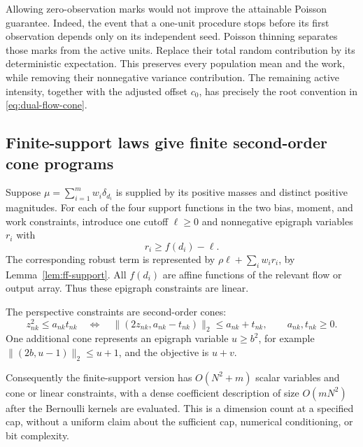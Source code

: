 Allowing zero-observation marks would not improve the attainable
Poisson guarantee. Indeed, the event that a one-unit procedure stops
before its first observation depends only on its independent seed.
Poisson thinning separates those marks from the active units. Replace
their total random contribution by its deterministic expectation.
This preserves every population mean and the work, while removing
their nonnegative variance contribution. The remaining active
intensity, together with the adjusted offset $c_0$, has precisely
the root convention in \eqref{eq:dual-flow-cone}.

\subsection{Finite-support laws give finite second-order cone programs}

Suppose $\mu=\sum_{i=1}^{m}w_i\delta_{d_i}$ is supplied by its positive
masses and distinct positive magnitudes. For each of the four support
functions in the two bias, moment, and work constraints, introduce
one cutoff $\ell\ge0$ and nonnegative epigraph variables $r_i$ with
\[
 r_i\ge f(d_i)-\ell.
\]
The corresponding robust term is represented by
$\rho\ell+\sum_iw_ir_i$, by Lemma~\ref{lem:ff-support}.
All $f(d_i)$ are affine functions of the relevant flow or output
array. Thus these epigraph constraints are linear.

The perspective constraints are second-order cones:
\[
 z_{nk}^2\le a_{nk}t_{nk}
 \quad\Longleftrightarrow\quad
 \|(2z_{nk},a_{nk}-t_{nk})\|_2\le a_{nk}+t_{nk},
 \qquad a_{nk},t_{nk}\ge0.
\]
One additional cone represents an epigraph variable $u\ge b^2$,
for example
$\|(2b,u-1)\|_2\le u+1$, and the objective is $u+v$.

Consequently the finite-support version has $O(N^2+m)$ scalar
variables and cone or linear constraints, with a dense coefficient
description of size $O(mN^2)$ after the Bernoulli kernels are
evaluated. This is a dimension count at a specified cap, without a
uniform claim about the sufficient cap, numerical conditioning, or
bit complexity.

